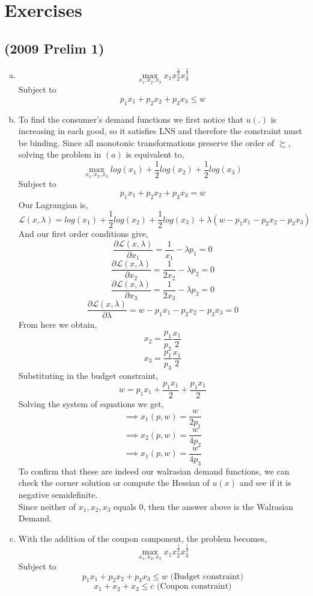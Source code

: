 \documentclass{article}
\begin{document}
\section*{Exercises}
\subsection*{(2009 Prelim 1)}
\begin{enumerate}[(a)]
    \item 
    \[\max_{x_1,x_2,x_3} x_1 x_2^{\frac{1}{2}} x_3^{\frac{1}{2}}\]
    Subject to
    \[p_1x_1 +p_2x_2 +p_3x_3 \leq w\]

    \item 
    To find the consumer's demand functions we first notice that $u(.)$ is increasing in each good, so it satisfies LNS and therefore the constraint must be binding. Since all monotonic transformations preserve the order of $\succsim$, solving the problem in $(a)$ is equivalent to,
    \[\max_{x_1,x_2,x_3} log(x_1) + \frac{1}{2}log(x_2)+\frac{1}{2}log(x_3)\]
    Subject to
    \[p_1x_1 +p_2x_2 +p_3x_3 = w\]
    Our Lagrangian is,
    \[\mathcal{L}(x,\lambda) = log(x_1) + \frac{1}{2}log(x_2)+\frac{1}{2}log(x_3) + \lambda(w-p_1x_1 -p_2x_2 -p_3x_3)\]
    And our first order conditions give,
    \[\frac{\partial\mathcal{L}(x,\lambda)}{\partial x_1} = \frac{1}{x_1} - \lambda p_1 = 0\]
    \[\frac{\partial\mathcal{L}(x,\lambda)}{\partial x_2} = \frac{1}{2x_2} - \lambda p_2 = 0\]
    \[\frac{\partial\mathcal{L}(x,\lambda)}{\partial x_3} = \frac{1}{2x_3} - \lambda p_3 = 0\]
    \[\frac{\partial\mathcal{L}(x,\lambda)}{\partial \lambda} = w-p_1x_1 -p_2x_2 -p_3x_3 = 0\]
    From here we obtain,
    \[x_2 = \frac{p_1}{p_2}\frac{x_1}{2}\]
    \[x_3 = \frac{p_1}{p_3}\frac{x_1}{2}\]
    Substituting in the budget constraint,
    \[w = p_1 x_1 + \frac{p_1 x_1}{2} + \frac{p_1 x_1}{2}\]
    Solving the system of equations we get,
    \[\implies x_1(p,w) = \frac{w}{2p_1}\]
    \[\implies x_2(p,w) = \frac{w}{4p_2}\]
    \[\implies x_1(p,w) = \frac{w}{4p_3}\]
    To confirm that these are indeed our walrasian demand functions, we can check the corner solution or compute the Hessian of $u(x)$ and see if it is negative semidefinite.\\
    Since neither of $x_1,x_2,x_3$ equals 0, then the answer above is the Walrasian Demand.

    \item 
    With the addition of the coupon component, the problem becomes,
        \[\max_{x_1,x_2,x_3} x_1 x_2^{\frac{1}{2}} x_3^{\frac{1}{2}}\]
    Subject to
    \[p_1x_1 +p_2x_2 +p_3x_3 \leq w \text{ (Budget constraint)}\]
    \[x_1+x_2+x_3 \leq c \text{ (Coupon constraint)}\]


\end{enumerate}
\end{document}
